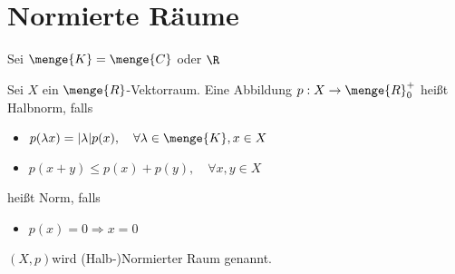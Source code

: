 \section{Normierte Räume}
Sei $\menge{K}=\menge{C}$ oder $\R$
\begin{dfn}
	Sei $X$ ein $\menge{R}$-Vektorraum.
	Eine Abbildung $ p:X\rightarrow \menge{R} _0^+ $ heißt Halbnorm, falls
	\begin{itemize}
		\item $p(\lambda x)=|\lambda |p(x),\quad \forall \lambda \in \menge{K}, x \in X $
		\item $p(x+y) \le p(x)+p(y),\quad \forall x,y \in X$
	\end{itemize}
	heißt Norm, falls
	\begin{itemize}
		\item $p(x)=0 \Rightarrow x=0$
	\end{itemize}
	$(X,p)$wird (Halb-)Normierter Raum genannt.
\end{dfn}